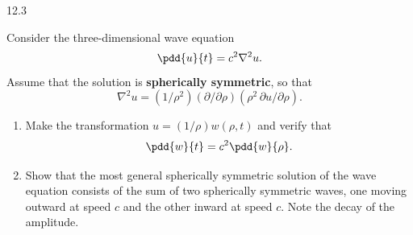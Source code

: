 \begin{exercises}{12.3}
\item \label{ex:12.3.6}
Consider the three-dimensional wave equation
\[
\pdd{u}{t} = c^2\nabla^2 u.
\]
Assume that the solution is \textbf{spherically symmetric}, so that
\[
\nabla^2 u = (1/\rho^2)(\partial/\partial\rho)(\rho^2\,\partial u/\partial\rho).
\]
\begin{enumerate}
\item[(a)] Make the transformation $u = (1/\rho)w(\rho,t)$ and verify that
\[
\pdd{w}{t} = c^2\pdd{w}{\rho}.
\]
\item[(b)] Show that the most general spherically symmetric solution of the wave equation consists of the sum of two spherically symmetric waves, one moving outward at speed $c$ and the other inward at speed $c$.  Note the decay of the amplitude.
\end{enumerate}

\end{exercises}
